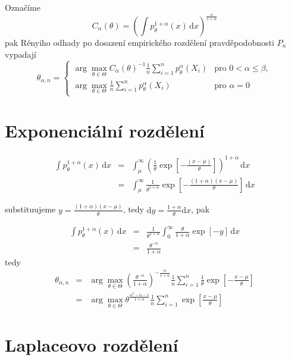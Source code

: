 \documentclass[11pt]{article}
\newcommand{\intpa}{\int p_\theta^{1+\alpha}(x) \, \mathrm{d}x }
\newcommand{\fn}{\frac{1}{n} \sum_{i=1}^n p_{\theta}^{\alpha}\left( X_i \right)}
\newcommand{\Cat}{C_\alpha\left( \theta \right)}
\newcommand{\amtiT}{\arg \max_{\theta \in \Theta}}
\begin{document}
Označíme
\begin{equation}
	\Cat = \left( \intpa \right)^{\frac{\alpha}{1+\alpha}}
\end{equation}
pak Rényiho odhady po dosazení empirického rozdělení pravděpodobnosti $ P_n $ vypadají
\begin{equation}
	\theta_{\alpha,n} = 
	\begin{cases}
		\displaystyle{ \amtiT \Cat^{-1} \fn } & \text{pro } 0 < \alpha \leq \beta, \\
		\displaystyle{ \amtiT  \fn } & \text{pro } \alpha = 0
	\end{cases}	
\end{equation}



\section{Exponenciální rozdělení}

\begin{eqnarray}
\intpa & = & \int_{\mu }^{\infty } \left( {\frac{1}{\theta} \exp{ \left[ -\frac{(x -\mu )}{\theta } \right] }} \right) ^{1 + \alpha} \, \mathrm{d}x \nonumber\\
 & = & \int_{\mu }^{\infty } {\frac{1}{\theta^{ 1 + \alpha}} \exp{ \left[ -\frac{(1 + \alpha )(x -\mu )}{\theta } \right] }} \, \mathrm{d}x \nonumber
\end{eqnarray} 

substituujeme $ y = \frac{(1+\alpha)(x-\mu)}{\theta} $, tedy $\mathrm{d}y = \frac{1+\alpha}{\theta}\mathrm{d}x $, pak

\begin{eqnarray}
\intpa & = & \frac{1}{\theta^{ 1 + \alpha}} \int_{0}^{\infty } {\frac{\theta}{1+\alpha} \exp{ \left[ -y \right] }} \, \mathrm{d}x \nonumber\\
& = & \frac{\theta ^{-\alpha }}{1+\alpha }
\end{eqnarray}
tedy 
\begin{eqnarray}
	\theta_{\alpha,n} &= &\amtiT \left( \frac{\theta ^{-\alpha }}{1+\alpha } \right)^{-\frac{\alpha}{1+\alpha}} \frac{1}{n} \sum_{i=1}^n \frac{1}{\theta} \exp \left[-\frac{x-\mu}{\theta} \right] \nonumber\\
	&=&\amtiT \theta^{\frac{\alpha^2 - \alpha - 1}{1+\alpha}} \frac{1}{n}\sum_{i=1}^n \exp \left[\frac{x-\mu}{\theta} \right]
\end{eqnarray}



\section{Laplaceovo rozdělení}
\end{document}
